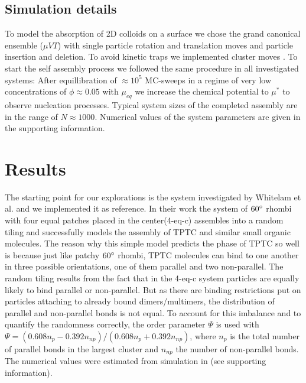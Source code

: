 \documentclass[a4paper,twocolumn]{revtex4}
\begin{document}
\subsection{Simulation details }
To model the absorption of 2D colloids on a surface we chose the grand canonical ensemble ($\mu VT$) with single particle rotation and translation moves and particle insertion and deletion. 
To avoid kinetic traps we implemented cluster moves \cite{XX}.
To start the self assembly process we followed the same procedure in all investigated systems:
After equillibration of $\approx 10^5$ MC-sweeps in a regime of very low concentrations of $\phi\approx 0.05$ with $\mu_{eq}$ we increase the chemical potential to $\mu^{*}$ to observe nucleation processes. 
Typical system sizes of the completed assembly are in the range of $N\approx 1000$.
Numerical values of the system parameters are given in the supporting information.

\section{Results}

The starting point for our explorations is the system investigated by Whitelam et al.\cite{Whitelam} and we implemented it as reference.
In their work the system of $60\degree$ rhombi with four equal patches placed in the center(4-eq-c) assembles into a random tiling and successfully models the assembly of TPTC and similar small organic molecules.
The reason why this simple model predicts the phase of TPTC so well is because just like patchy $60\degree$ rhombi, TPTC molecules can bind to one another in three possible orientations, one of them parallel and two non-parallel. 
The random tiling results from the fact that in the 4-eq-c system particles are equally likely to bind parallel or non-parallel. 
But as there are binding restrictions put on particles attaching to already bound dimers/multimers, the distribution of parallel and non-parallel bonds 
is not equal. To account for this imbalance and to quantify the randomness correctly, the order parameter 
$\Psi$ is used with $\Psi = (0.608 n_{p} - 0.392 n_{np}) / (0.608 n_{p} + 0.392 n_{np})$, 
where $n_{p}$ is the total number of parallel bonds in the largest cluster
and $n_{np}$ the number of non-parallel bonds. The numerical values were estimated from simulation in \cite{Stannard2012} (see supporting information).
\end{document}
